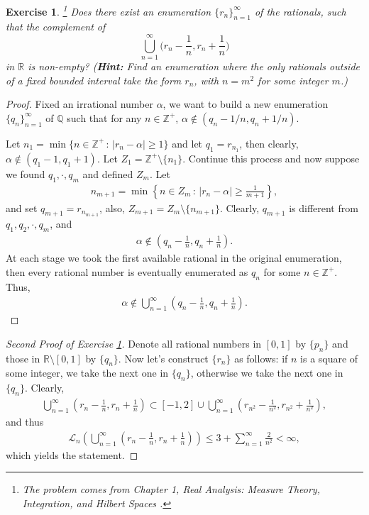 \documentclass[11pt]{book}
\newtheorem{exercise}{Exercise}[section]
\theoremstyle{definition}
\numberwithin{equation}{chapter}
\def\L{{\mathcal L}}
\begin{document}
\begin{exercise}\label{exercise_115}\footnote{The problem comes from Chapter 1, {\em Real Analysis: Measure Theory, Integration, and Hilbert Spaces} \cite{8}.} Does there exist an enumeration $\{ r_n\}^\infty_{n=1}$ of the rationals, such that the complement of
$$
\bigcup^\infty_{n=1}\biggr(r_n-\frac{1}{n},r_n+\frac{1}{n}\biggr)
$$
in $\mathbb{R}$ is non-empty? ({\bf Hint:} Find an enumeration where the only rationals outside of a fixed bounded interval take the form $r_n$, with $n = m^2$ for some integer $m$.)
\end{exercise}
\begin{proof}\cite{19}
Fixed an irrational number $\alpha$, we want to build a new enumeration $\{q_n\}^\infty_{n=1}$ of $\mathbb{Q}$ such that for any $n \in \mathbb{Z}^+$, $\alpha \notin \left(q_n - 1/n, q_n + 1/n\right)$.

Let $n_1 = \min\{n \in \mathbb{Z}^+ \,:\, \left|r_n - \alpha\right| \geq 1 \}$ and let $q_1 = r_{n_1}$, then clearly, $\alpha \notin (q_1 - 1, q_1 + 1)$. Let $Z_1 = \mathbb{Z}^+ \setminus \{n_1\}$. Continue this process and now suppose we found $q_1,\cdot,q_m$ and defined $Z_m$. Let 
\begin{align*}
    n_{m+1} = \min \left\{n \in Z_m \,:\, \left|r_n - \alpha\right| \geq \frac{1}{m+1}\right\},
\end{align*}
and set $q_{m+1} = r_{n_{m+1}}$, also, $Z_{m+1} = Z_m\setminus \{n_{m+1}\}$. Clearly, $q_{m+1}$ is different from $q_1,q_2,\cdot,q_m$, and 
\begin{align*}
    \alpha \notin \left(q_n - \frac{1}{n}, q_n + \frac{1}{n}\right).
\end{align*}
At each stage we took the first available rational in the original enumeration, then every rational number is eventually enumerated as $q_n$ for some $n \in \mathbb{Z}^+$. Thus, 
\begin{align*}
    \alpha \notin \bigcup^\infty_{n=1}\left(q_n - \frac{1}{n}, q_n + \frac{1}{n}\right).
\end{align*}
\end{proof}

\medskip

\begin{proof}[Second Proof of Exercise \ref{exercise_115}]\cite{20} 
Denote all rational numbers in $[0,1]$ by $\{p_n\}$ and those in $\mathbb{R} \setminus [0,1]$ by $\{q_n\}$. Now let's construct $\{r_n\}$ as follows: if $n$ is a square of some integer, we take the next one in $\{q_n\}$, otherwise we take the next one in $\{q_n\}$. Clearly, 
\begin{align*}
    \bigcup^\infty_{n=1}\left(r_n - \frac{1}{n}, r_n + \frac{1}{n}\right) \subset [-1,2] \cup \bigcup^\infty_{n=1} \left(r_{n^2} - \frac{1}{n^2}, r_{n^2} + \frac{1}{n^2}\right),
\end{align*}
and thus 
\begin{align*}
    \L_n\left(\bigcup^\infty_{n=1}\left(r_n - \frac{1}{n}, r_n + \frac{1}{n}\right)\right) \leq 3 + \sum^\infty_{n=1} \frac{2}{n^2} < \infty,
\end{align*}
which yields the statement.
\end{proof}
\end{document}
